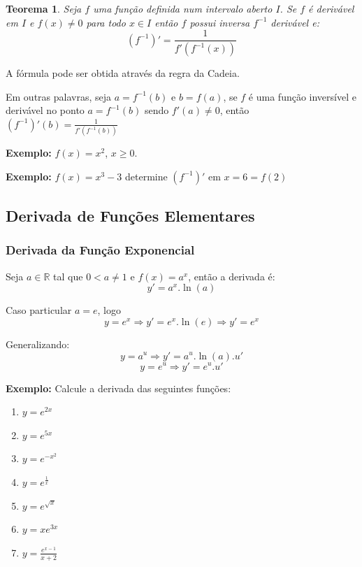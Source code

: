 \documentclass[oneside,a4paper,12pt]{article}
\newtheorem{theorem}{Teorema}[section]
\begin{document}
\begin{theorem}
	Seja $f$ uma função definida num intervalo aberto $I$. Se $f$ é derivável em $I$ e $f(x) \neq 0$ para todo $x \in I$ então $f$ possui inversa $f^{-1}$ derivável e:
	\begin{equation}
	(f^{-1})' = \frac{1}{f'(f^{-1}(x))}
	\end{equation}
\end{theorem}

A fórmula pode ser obtida através da regra da Cadeia.
\vspace{200pt}

Em outras palavras, seja $a=f^{-1}(b)$ e $b=f(a)$, se $f$ é uma função inversível e derivável no ponto $a = f^{-1}(b)$ sendo $f'(a) \neq 0$, então $(f^{-1})'(b) = \frac{1}{f'(f^{-1}(b))}$

{\bf Exemplo:} $f(x) = x^2$, $x \geq 0$.
\vspace{100pt}

{\bf Exemplo:} $f(x) = x^{3} - 3$ determine $(f^{-1})'$ em $x=6=f(2)$
\vspace{120pt}


\subsection{Derivada de Funções Elementares}

\subsubsection{Derivada da Função Exponencial}
Seja $a \in \mathbb{R}$ tal que $0 < a \neq 1$ e $f(x) = a^x$, então a derivada é: $$y' = a^x .\ln(a)$$

\vspace{200pt}

Caso particular $a = e$, logo $$ y = e^x \Rightarrow y' = e^x .\ln(e) \Rightarrow y' = e^x $$


Generalizando: $$y = a^u \Rightarrow y' = a^u.\ln(a).u'$$ $$y = e^u \Rightarrow y' = e^u.u'$$

{\bf Exemplo:} Calcule a derivada das seguintes funções:
\begin{enumerate}
	\item $y = e^{2x}$
	\item $y = e^{5x}$
	\item $y = e^{-x^2}$
	\item $y = e^{\frac{1}{x}}$
	\item $y = e^{\sqrt{x}}$
	\item $y = xe^{3x}$
	\item $y = \frac{e^{x-1}}{x+2}$
\end{enumerate}
\newpage
\end{document}

